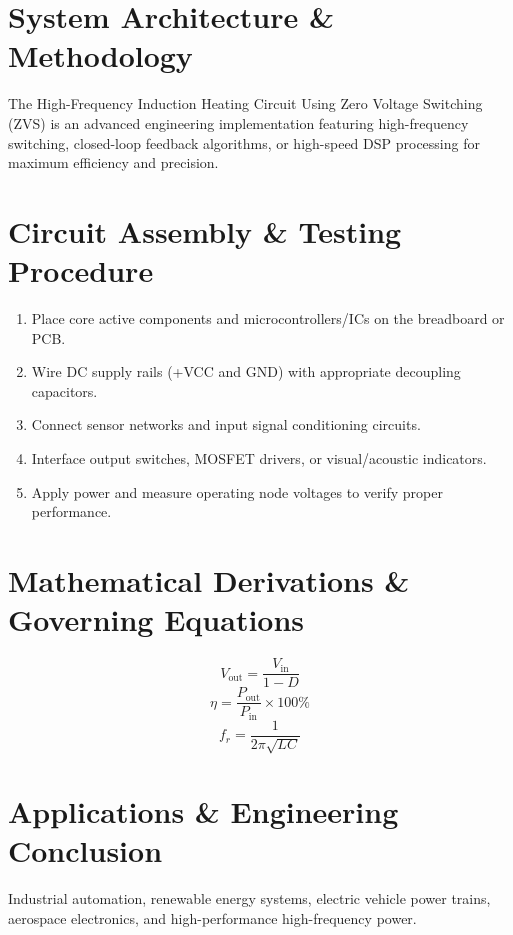 \documentclass[11pt,a4paper]{article}
\begin{document}
\section{System Architecture \& Methodology}
The High-Frequency Induction Heating Circuit Using Zero Voltage Switching (ZVS) is an advanced engineering implementation featuring high-frequency switching, closed-loop feedback algorithms, or high-speed DSP processing for maximum efficiency and precision.

\section{Circuit Assembly \& Testing Procedure}
\begin{enumerate}
    \item Place core active components and microcontrollers/ICs on the breadboard or PCB.
    \item Wire DC supply rails (+VCC and GND) with appropriate decoupling capacitors.
    \item Connect sensor networks and input signal conditioning circuits.
    \item Interface output switches, MOSFET drivers, or visual/acoustic indicators.
    \item Apply power and measure operating node voltages to verify proper performance.
\end{enumerate}

\section{Mathematical Derivations \& Governing Equations}
\begin{equation}
V_{\text{out}} = \frac{V_{\text{in}}}{1 - D}
\end{equation}
\begin{equation}
\eta = \frac{P_{\text{out}}}{P_{\text{in}}} \times 100\%
\end{equation}
\begin{equation}
f_r = \frac{1}{2\pi \sqrt{L C}}
\end{equation}

\section{Applications \& Engineering Conclusion}
Industrial automation, renewable energy systems, electric vehicle power trains, aerospace electronics, and high-performance high-frequency power.
\end{document}
